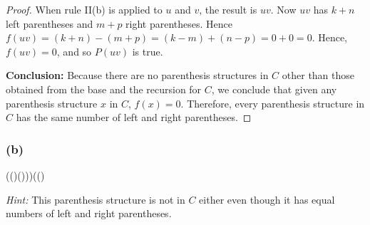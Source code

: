 \documentclass[14pt]{extarticle}
\begin{document}
\begin{proof}
When rule II(b) is applied to $u$ and $v$, the result is $uv$. Now $uv$ has \(k + n\) left parentheses and \(m + p\) 
right parentheses. Hence \(f(uv) = (k + n) - (m + p) = (k - m) + (n - p) = 0 + 0 = 0\). Hence, \(f(uv) = 0\), and so $P(uv)$ is true. 

{\bf Conclusion:} Because there are no parenthesis structures in $C$ other than those obtained from the base 
and the recursion for $C$, we conclude that given any parenthesis structure $x$ in $C$, \(f(x) = 0\). Therefore, 
every parenthesis structure in $C$ has the same number of left and right parentheses.
\end{proof}

\subsubsection{(b)}
(()()))(()

{\it Hint:} This parenthesis structure is not in $C$ either even though it has equal numbers of left and right parentheses.
\end{document}
